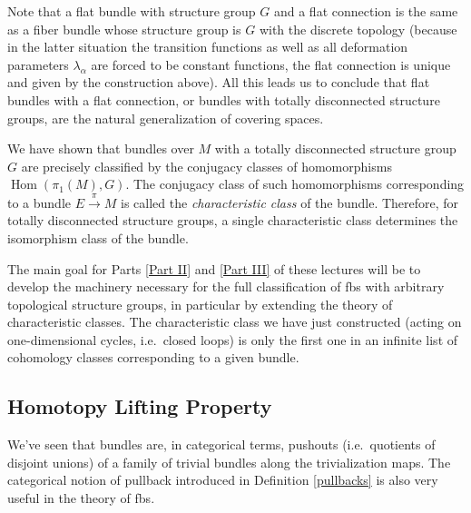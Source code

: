 \documentclass[english,letterpaper]{article}%
\numberwithin{equation}{section}
\numberwithin{figure}{section}
\numberwithin{table}{section}
\theoremstyle{definition}
\theoremstyle{definition}
\theoremstyle{definition}
\theoremstyle{plain}
\theoremstyle{plain}
\theoremstyle{plain}
\theoremstyle{plain}
\theoremstyle{remark}
\theoremstyle{remark}
\def\red{\color{red}}
\DeclareMathOperator{\Hom}{Hom}
\newcommand{\PRLsep}{   %
           \noindent\makebox[\linewidth]{
                \resizebox{0.5\linewidth}{1pt}{$\blacklozenge$}}}
\begin{document}
\begin{example}
	Note that a flat bundle with structure group $G$ and a flat connection is the same as a fiber bundle whose structure group is $G$ with the discrete topology (because in the latter situation the transition functions as well as all deformation parameters $\lambda_\alpha$ are forced to be constant functions, the flat connection is unique and given by the construction above). All this leads us to conclude that flat bundles with a flat connection, or bundles with totally disconnected structure groups, are the natural generalization of covering spaces.
	
	We have shown that bundles over $M$ with a totally disconnected structure group $G$ are precisely classified by the conjugacy classes of homomorphisms $\Hom(\pi_1(M),G)$. The conjugacy class of such homomorphisms corresponding to a bundle $E\overset{\pi}{\to}M$ is called the \emph{characteristic class} of the bundle. Therefore, for totally disconnected structure groups, a single characteristic class determines the isomorphism class of the bundle.
	
	The main goal for Parts \ref{Part II} and \ref{Part III} of these lectures will be to develop the machinery necessary for the full classification of \glspl{fb} with arbitrary topological structure groups, in particular by extending the theory of characteristic classes. The characteristic class we have just constructed (acting on one-dimensional cycles, i.e.\ closed loops) is only the first one in an infinite list of cohomology classes corresponding to a given bundle.
	
\end{example}

\subsection{Homotopy Lifting Property}
    We've seen that bundles are, in categorical terms, pushouts (i.e.\ quotients of disjoint unions) of a family of trivial bundles along the trivialization maps. The categorical notion of pullback introduced in Definition \ref{pullbacks} is also very useful in the theory of \glspl{fb}.
\end{document}
